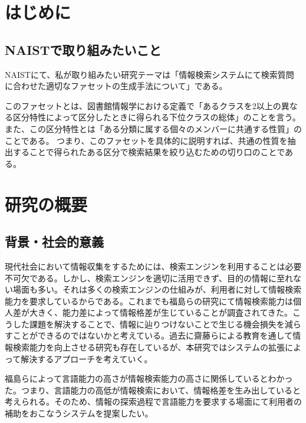 \documentclass[a4j,10pt, twocolumn]{jarticle} \usepackage[dvipdfmx]{graphicx} \usepackage{amssymb} \usepackage{amsmath}
\begin{document}
\section{はじめに}
\subsection{NAISTで取り組みたいこと}
NAISTにて、私が取り組みたい研究テーマは「情報検索システムにて検索質問に合わせた適切なファセットの生成手法について」である。

このファセットとは、図書館情報学における定義で「あるクラスを2以上の異なる区分特性によって区分したときに得られる下位クラスの総体\cite{libdic}」のことを言う。
また、この区分特性とは「ある分類に属する個々のメンバーに共通する性質」のことである。
つまり、このファセットを具体的に説明すれば、共通の性質を抽出することで得られたある区分で検索結果を絞り込むための切り口のことである。
\section{研究の概要}
\subsection{背景・社会的意義}
 現代社会において情報収集をするためには、検索エンジンを利用することは必要不可欠である。しかし、検索エンジンを適切に活用できず、目的の情報に至れない場面も多い。それは多くの検索エンジンの仕組みが、利用者に対して情報検索能力を要求しているからである。これまでも福島らの研究にて情報検索能力は個人差が大きく、能力差によって情報格差が生じていることが調査されてきた\cite{fukushima}。こうした課題を解決することで、情報に辿りつけないことで生じる機会損失を減らすことができるのではないかと考えている。過去に齋藤らによる教育を通して情報検索能力を向上させる研究\cite{saito}も存在しているが、本研究ではシステムの拡張によって解決するアプローチを考えていく。

 福島らによって言語能力の高さが情報検索能力の高さに関係しているとわかった\cite{fukushima}。つまり、言語能力の高低が情報検索において、情報格差を生み出していると考えられる。そのため、情報の探索過程で言語能力を要求する場面にて利用者の補助をおこなうシステムを提案したい。
\end{document}
